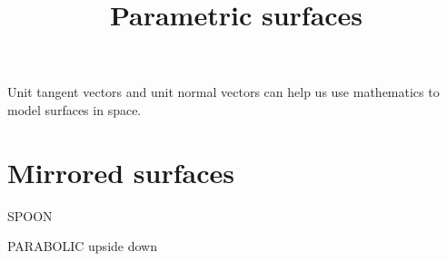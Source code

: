 \documentclass{ximera}
\title[Dig-In:]{Parametric surfaces}
\begin{document}
\begin{abstract}
\end{abstract}
\maketitle

Unit tangent vectors and unit normal vectors can help us use
mathematics to model surfaces in space.



\section{Mirrored surfaces}

SPOON

PARABOLIC
upside down
\end{document}

